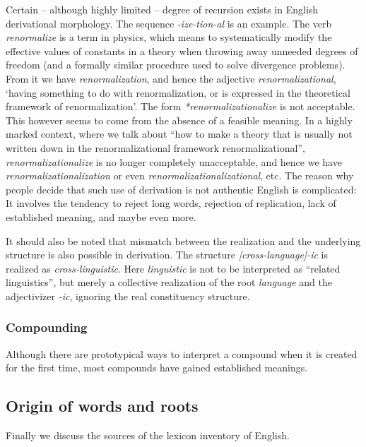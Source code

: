 \documentclass[UTF8, a4paper, oneside, scheme=plain]{ctexrep}
\newcommand{\corpus}[1]{\emph{#1}}
\newcommand{\translate}[1]{`#1'}
\begin{document}
Certain -- although highly limited -- degree of recursion exists in English derivational morphology.
The sequence \corpus{-ize-tion-al} is an example.
The verb \corpus{renormalize} is a term in physics,
which means to systematically modify the effective values of constants in a theory 
when throwing away unneeded degrees of freedom 
(and a formally similar procedure used to solve divergence problems).
From it we have \corpus{renormalization},
and hence the adjective \corpus{renormalizational},
\translate{having something to do with renormalization,
or is expressed in the theoretical framework of renormalization}.
The form \corpus{*renormalizationalize} is not acceptable.
This however seems to come from the absence of a feasible meaning.
In a highly marked context,
where we talk about 
``how to make a theory that is usually not written down in the renormalizational framework
renormalizational'',
\corpus{renormalizationalize} is no longer completely unacceptable,
and hence we have \corpus{renormalizationalization} or even \corpus{renormalizationalizational}, etc.
The reason why people decide that such use of derivation is not authentic English is complicated:
It involves the tendency to reject long words, 
rejection of replication,
lack of established meaning,
and maybe even more.

It should also be noted that mismatch 
between the realization and the underlying structure 
is also possible in derivation.
The structure \corpus{[cross-language]-ic} is realized as 
\corpus{cross-linguistic}.
Here \corpus{linguistic} is not to be interpreted as 
``related linguistics'',
but merely a collective realization of the root \corpus{language} and the adjectivizer \corpus{-ic},
ignoring the real constituency structure.

\subsubsection{Compounding}\label{sec:pos.overview.derivation.compound}

Although there are prototypical ways to interpret a compound
when it is created for the first time,
most compounds have gained established meanings.



\subsection{Origin of words and roots}

Finally we discuss the sources of the lexicon inventory of English.
\end{document}
